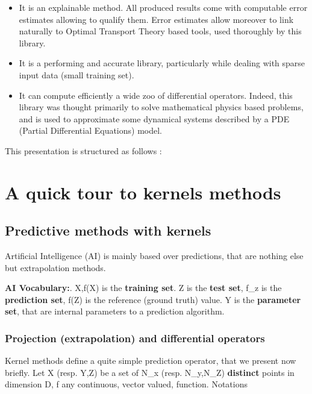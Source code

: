 \documentclass[]{article}
\def\({}%
\def\){}%
\numberwithin{equation}{section}
\begin{document}
\begin{itemize}
\item It is an explainable method. All produced results come with computable error estimates allowing to qualify them. Error estimates allow moreover to link naturally to Optimal Transport Theory based tools, used thoroughly by this library.  
\item It is a performing and accurate library, particularly while dealing with sparse input data (small training set).
\item It can compute efficiently a wide zoo of differential operators. Indeed, this library was thought primarily to solve mathematical physics based problems, and is used to approximate some dynamical systems described by a PDE (Partial Differential Equations) model.
\end{itemize}

\newpage

This presentation is structured as follows :

\tableofcontents

\newpage

\section{A quick tour to kernels
methods}\label{a-quick-tour-to-kernels-methods}

\subsection{Predictive methods with
kernels}\label{predictive-methods-with-kernels}

Artificial Intelligence (AI) is mainly based over predictions, that are
nothing else but extrapolation methods.

\textbf{AI Vocabulary:}. \(X,f(X)\) is the \textbf{training set}. \(Z\)
is the \textbf{test set}, \(f_z\) is the \textbf{prediction set},
\(f(Z)\) is the reference (ground truth) value. \(Y\) is the
\textbf{parameter set}, that are internal parameters to a prediction
algorithm.

\subsubsection{Projection (extrapolation) and differential
operators}\label{projection-extrapolation-and-differential-operators}

Kernel methods define a quite simple prediction operator, that we
present now briefly. Let \(X\) (resp. \(Y,Z\)) be a set of \(N_x\)
(resp. \(N_y,N_Z\)) \textbf{distinct} points in dimension \(D\), \(f\)
any continuous, vector valued, function. Notations
\end{document}
